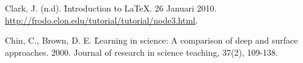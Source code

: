 %
% 

% 
% 
\begin{thebibliography}{4}

{Clark, J. (n.d). \f{Introduction to LaTeX}.
26 Januari 2010. \url{http://frodo.elon.edu/tutorial/tutorial/node3.html}.}

{Chin, C., Brown, D. E. \f{Learning in science: A comparison of deep and surface approaches}.
2000. Journal of research in science teaching, 37(2), 109-138.}

\end{thebibliography}

